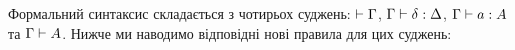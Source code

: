 \documentclass[12pt]{article}
\let\prn\DelimPrn
\begin{document}
Формальний синтаксис \MTT{} складається з чотирьох суджень: $\IsCx{\Gamma}$, $\IsSb{\delta}{\Delta}$, $\IsTm{a}{A}$ та $\IsTy{A}$. Нижче ми наводимо відповідні нові правила для цих суджень:%
\def\MathparLineskip{\lineskip=11pt}
\end{document}

